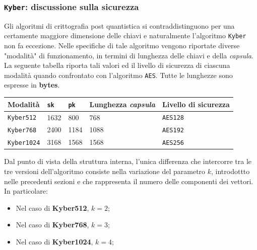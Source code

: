 \documentclass[a4paper, 12pt, oneside]{article}
\theoremstyle{definition}
\begin{document}
\newpage
\subsubsection{\texttt{Kyber}: discussione sulla sicurezza}
Gli algoritmi di crittografia post quantistica si contraddistinguono per una certamente maggiore dimensione delle chiavi e naturalmente l'algoritmo \texttt{Kyber} non fa eccezione. Nelle specifiche di tale algoritmo vengono riportate diverse "modalità" di funzionamento, in termini di lunghezza delle chiavi e della \textit{capsula}. La seguente tabella riporta tali valori ed il livello di sicurezza di ciascuna modalità quando confrontato con l'algoritmo \texttt{AES}. Tutte le lunghezze sono espresse in \textbf{bytes}.

\begin{table}[H]
    \centering
    \begin{tabular}{|l|l|l|l|l|}
    \hline
    Modalità  & \texttt{sk} \footnotemark[5] & \texttt{pk} \footnotemark[6] & Lunghezza \textit{capsula} & Livello di sicurezza \\ \hline
    \texttt{Kyber512}  & 1632                     & 800                       & 768                        & \texttt{AES128}              \\ \hline
    \texttt{Kyber768}  & 2400                     & 1184                      & 1088                       & \texttt{AES192}              \\ \hline
    \texttt{Kyber1024} & 3168                     & 1568                      & 1568                       & \texttt{AES256}              \\ \hline
    \end{tabular}
\end{table}


Dal punto di vista della struttura interna, l'unica differenza che intercorre tra le tre versioni dell'algoritmo consiste nella variazione del parametro $k$, introdottto nelle precedenti sezioni e che rappresenta il numero delle componenti dei vettori. In particolare:

\begin{itemize}
    \item Nel caso di \textbf{Kyber512}, $k = 2$;
    \item Nel caso di \textbf{Kyber768}, $k = 3$;
    \item Nel caso di \textbf{Kyber1024}, $k = 4$;
\end{itemize}
\end{document}
